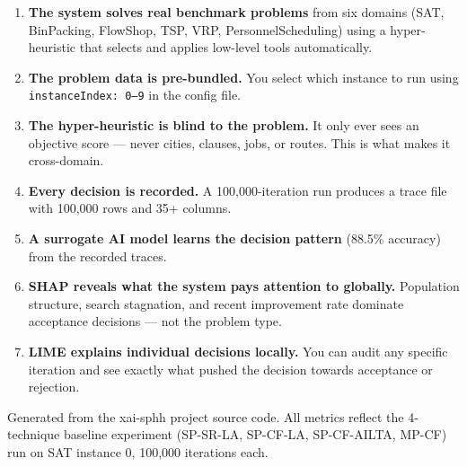 \documentclass[12pt, a4paper]{article}
\begin{document}
\begin{keybox}
\begin{enumerate}[leftmargin=0.5cm, itemsep=6pt]
  \item \textbf{The system solves real benchmark problems} from six domains
        (SAT, BinPacking, FlowShop, TSP, VRP, PersonnelScheduling) using a
        hyper-heuristic that selects and applies low-level tools automatically.

  \item \textbf{The problem data is pre-bundled.} You select which instance to
        run using \texttt{instanceIndex: 0--9} in the config file.

  \item \textbf{The hyper-heuristic is blind to the problem.} It only ever sees
        an objective score --- never cities, clauses, jobs, or routes. This is
        what makes it cross-domain.

  \item \textbf{Every decision is recorded.} A 100,000-iteration run produces a
        trace file with 100,000 rows and 35+ columns.

  \item \textbf{A surrogate AI model learns the decision pattern} (88.5\%
        accuracy) from the recorded traces.

  \item \textbf{SHAP reveals what the system pays attention to globally.}
        Population structure, search stagnation, and recent improvement rate
        dominate acceptance decisions --- not the problem type.

  \item \textbf{LIME explains individual decisions locally.} You can audit any
        specific iteration and see exactly what pushed the decision towards
        acceptance or rejection.
\end{enumerate}
\end{keybox}

\vfill
{\small\color{darkgrey}
Generated from the xai-sphh project source code. All metrics reflect the
4-technique baseline experiment (SP-SR-LA, SP-CF-LA, SP-CF-AILTA, MP-CF) run
on SAT instance 0, 100,000 iterations each.}
\end{document}
